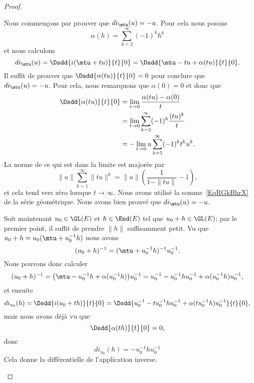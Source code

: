 \begin{proof}
\begin{subproof}
		Nous commençons par prouver que \( di_{\mtu}(u)=-u\). Pour cela nous posons
		\begin{equation}
			\alpha(h)=\sum_{k=2}^{\infty}(-1)^kh^k
		\end{equation}
		et nous calculons
		\begin{equation}
			di_{\mtu}(u)=\Dsdd{ i(\mtu+tu) }{t}{0}=\Dsdd{ \mtu-tu+\alpha(tu) }{t}{0}.
		\end{equation}
		Il suffit de prouver que \( \Dsdd{ \alpha(tu) }{t}{0}=0\) pour conclure que \( di_{\mtu}(u)=-u\). Pour cela, nous remarquons que \( \alpha(0)=0\) et donc que
		\begin{subequations}
			\begin{align}
				\Dsdd{ \alpha(tu) }{t}{0} & =\lim_{t\to 0} \frac{ \alpha(tu)-\alpha(0) }{ t }            \\
				                          & =\lim_{t\to 0} \sum_{k=2}^{\infty}(-1)^k\frac{ (tu)^k }{ t } \\
				                          & =-\lim_{t\to 0} u\sum_{k=1}^{\infty}(-1)^kt^ku^k.
			\end{align}
		\end{subequations}
		La norme de ce qui est dans la limite est majorée par
		\begin{equation}
			\| u \|\sum_{k=1}^{\infty}\| tu \|^k=\| u \|\left( \frac{1}{ 1-\| tu \| }-1 \right),
		\end{equation}
		et cela tend vers zéro lorsque \( t\to\infty\). Nous avons utilisé la somme~\ref{EqRGkBhrX} de la série géométrique. Nous avons bien prouvé que \( di_{\mtu}(u)=-u\).

		Soit maintenant \( u_0\in\GL(E)\) et \( h\in\End(E)\) tel que \( u_0+h\in \GL(E)\); par le premier point, il suffit de prendre \( \| h \|\) suffisamment petit. Vu que \( u_0+h=u_0(\mtu+u_0^{-1}h)\) nous avons
		\begin{equation}
			(u_0+h)^{-1}=(\mtu+u_0^{-1}h)^{-1}u_0^{-1}.
		\end{equation}
		Nous pouvons donc calculer
		\begin{equation}
			(u_0+h)^{-1}=\big( \mtu-u_0^{-1}h+\alpha(u_0^{-1}h) \big)u_0^{-1}=u_0^{-1}-u_0^{-1}hu_0^{-1}+\alpha(u_0^{-1}h)u_0^{-1},
		\end{equation}
		et ensuite
		\begin{equation}
			di_{u_0}(h)=\Dsdd{ i(u_0+th) }{t}{0}=\Dsdd{ u_0^{-1}-tu_0^{-1}hu_0^{-1}+\alpha(tu_0^{-1}h)u_0^{-1} }{t}{0},
		\end{equation}
		mais nous avons déjà vu que
		\begin{equation}
			\Dsdd{ \alpha(th) }{t}{0}=0,
		\end{equation}
		donc
		\begin{equation}
			di_{u_0}(h)=-u_0^{-1}hu_0^{-1}
		\end{equation}
		Cela donne la différentielle de l'application inverse.


\end{subproof}
\end{proof}
